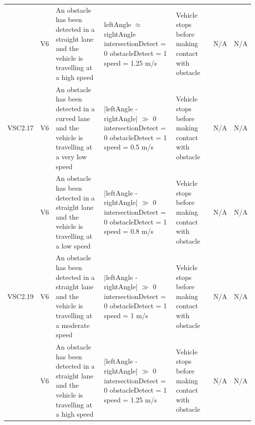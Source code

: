 \documentclass [10pt]{article}
\begin{document}
\begin{longtable}{ | p{ } | p{ } |  p{ } |  p{ } | p{ } | p{ } |  p{ } |}
    \rowcolor{tableCell}\multicolumn{1}{|c|}{VSC2.16} 
    & \multicolumn{1}{c|}{V6}
    & An obstacle has been detected in a straight lane and the vehicle is travelling at a high speed
    & leftAngle $\approx$ rightAngle \newline
    intersectionDetect = 0 \newline
    obstacleDetect = 1 \newline
    speed = 1.25 m/s
    & Vehicle stops before making contact with obstacle
    & N/A
    & \multicolumn{1}{c|}{N/A}\\
    
    \multicolumn{1}{|c|}{VSC2.17} 
    & \multicolumn{1}{c|}{V6}
    & An obstacle has been detected in a curved lane and the vehicle is travelling at a very low speed
    & |leftAngle - rightAngle| $\gg$ 0 \newline
    intersectionDetect = 0 \newline
    obstacleDetect = 1 \newline
    speed = 0.5 m/s
    & Vehicle stops before making contact with obstacle
    & N/A
    & \multicolumn{1}{c|}{N/A}\\ 
    
    \rowcolor{tableCell}\multicolumn{1}{|c|}{VSC2.18} 
    & \multicolumn{1}{c|}{V6}
    & An obstacle has been detected in a straight lane and the vehicle is travelling at a low speed
    & |leftAngle - rightAngle| $\gg$ 0 \newline
    intersectionDetect = 0 \newline
    obstacleDetect = 1 \newline
    speed = 0.8 m/s
    & Vehicle stops before making contact with obstacle
    & N/A
    & \multicolumn{1}{c|}{N/A}\\ 
    
    \multicolumn{1}{|c|}{VSC2.19} 
    & \multicolumn{1}{c|}{V6}
    & An obstacle has been detected in a straight lane and the vehicle is travelling at a moderate speed
    & |leftAngle - rightAngle| $\gg$ 0 \newline
    intersectionDetect = 0 \newline
    obstacleDetect = 1 \newline
    speed = 1 m/s
    & Vehicle stops before making contact with obstacle
    & N/A
    & \multicolumn{1}{c|}{N/A}\\
    
    \rowcolor{tableCell}\multicolumn{1}{|c|}{VSC2.20} 
    & \multicolumn{1}{c|}{V6}
    & An obstacle has been detected in a straight lane and the vehicle is travelling at a high speed
    & |leftAngle - rightAngle| $\gg$ 0 \newline
    intersectionDetect = 0 \newline
    obstacleDetect = 1 \newline
    speed = 1.25 m/s
    & Vehicle stops before making contact with obstacle
    & N/A
    & \multicolumn{1}{c|}{N/A}\\\hline
     

\end{longtable}
\end{document}
